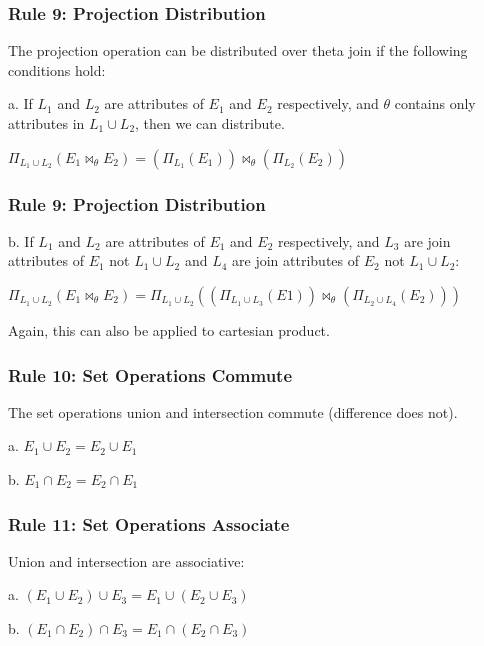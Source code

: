 \begin{frame}
\frametitle{Rule 9: Projection Distribution}

The projection operation can be distributed over theta join if the following conditions hold:

a. If $L_{1}$ and $L_{2}$ are attributes of $E_{1}$ and $E_{2}$ respectively, and $\theta$ contains only attributes in $L_{1} \cup L_{2}$, then we can distribute. 

$\Pi_{L_{1} \cup L_{2}}( E_{1} \bowtie_{\theta} E_{2} ) = (\Pi_{L_{1}}(E_{1})) \bowtie_{\theta} (\Pi_{L_{2}}(E_{2}))$

\end{frame}



\begin{frame}
\frametitle{Rule 9: Projection Distribution}

b. If $L_{1}$ and $L_{2}$ are attributes of $E_{1}$ and $E_{2}$ respectively, and $L_{3}$ are join attributes of $E_{1}$ not $L_{1} \cup L_{2}$ and $L_{4}$ are join attributes of $E_{2}$ not $L_{1} \cup L_{2}$:

$\Pi_{L_{1} \cup L_{2}} (E_{1} \bowtie_{\theta} E_{2}) = \Pi_{L_{1} \cup L_{2}}((\Pi_{L_{1} \cup L_{3}}(E1)) \bowtie_{\theta} (\Pi_{L_{2} \cup L_{4}}(E_{2})))$

Again, this can also be applied to cartesian product.


\end{frame}


\begin{frame}
\frametitle{Rule 10: Set Operations Commute}

The set operations union and intersection commute  (difference does not).

a. $E_{1} \cup E_{2} = E_{2} \cup E_{1}$

b. $E_{1} \cap E_{2} = E_{2} \cap E_{1}$


\end{frame}

\begin{frame}
\frametitle{Rule 11: Set Operations Associate}

Union and intersection are associative:

a. $(E_{1} \cup E_{2}) \cup E_{3} = E_{1} \cup (E_{2} \cup E_{3})$

b. $(E_{1} \cap E_{2}) \cap E_{3} = E_{1} \cap (E_{2} \cap E_{3})$

\end{frame}

